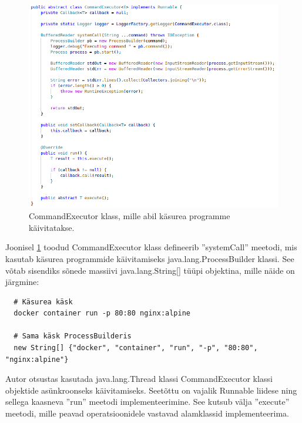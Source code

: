 \documentclass[12pt]{article}
\begin{document}
 
  \begin{figure} [ht] %
  \begin{center}
  \includegraphics[width=1.0\textwidth]{dockerdriver_commandexecutor}
  \caption{CommandExecutor klass, mille abil käsurea programme käivitatakse.}
  \label{fig:dockerdriver_commandexecutor}
  \end{center}
  \end{figure}
  
  \FloatBarrier
 
 
  Joonisel \ref{fig:dockerdriver_commandexecutor} toodud CommandExecutor klass
  defineerib ''systemCall'' meetodi, mis kasutab
  käsurea programmide käivitamiseks java.lang.ProcessBuilder klassi. See võtab sisendiks
  sõnede massiivi java.lang.String[] tüüpi objektina, mille näide on järgmine:
 
  \begin{verbatim}
  # Käsurea käsk
  docker container run -p 80:80 nginx:alpine
 
  # Sama käsk ProcessBuilderis
  new String[] {"docker", "container", "run", "-p", "80:80", "nginx:alpine"}
  \end{verbatim}
 
  Autor otsustas kasutada java.lang.Thread klassi CommandExecutor klassi objektide
  asünkroonseks käivitamiseks. Seetõttu on vajalik Runnable liidese ning sellega
  kaasneva ''run'' meetodi implementeerimine. See kutsub välja ''execute'' meetodi,
  mille peavad operatsioonidele vastavad alamklassid implementeerima.
 
\end{document}
